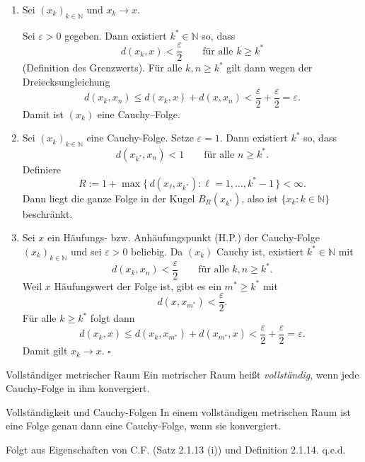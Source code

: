 \begin{beweisbox}
    \begin{enumerate}
    \item[(i)] Sei $(x_k)_{k\in\mathbb{N}}$ und $x_k\to x$.

    Sei $\varepsilon>0$ gegeben. Dann existiert $k^*\in\mathbb{N}$ so, dass
    $$
    d(x_k,x)<\frac{\varepsilon}{2}\qquad\text{für alle }k\ge k^*
    $$
    (Definition des Grenzwerts). Für alle $k,n\ge k^*$ gilt dann wegen der Dreiecksungleichung
    $$
    d(x_k,x_n)\le d(x_k,x)+d(x,x_n)<\frac{\varepsilon}{2}+\frac{\varepsilon}{2}=\varepsilon.
    $$
    Damit ist $(x_k)$ eine Cauchy--Folge.

    \item[(ii)] Sei $(x_k)_{k\in\mathbb{N}}$ eine Cauchy-Folge. Setze $\varepsilon=1$. Dann existiert $k^*$ so, dass
    $$
    d(x_{k^*},x_n)<1\qquad\text{für alle }n\ge k^*.
    $$
    Definiere
    $$
    R:=1+\max\{\,d(x_\ell,x_{k^*}):\ell=1,\dots,k^*-1\,\}<\infty.
    $$
    Dann liegt die ganze Folge in der Kugel $B_R(x_{k^*})$, also ist $\{x_k:k\in\mathbb{N}\}$ beschränkt.

    \item[(iii)] Sei $x$ ein Häufungs- bzw. Anhäufungspunkt (H.P.) der Cauchy-Folge $(x_k)_{k\in\mathbb{N}}$ und sei $\varepsilon>0$ beliebig. Da $(x_k)$ Cauchy ist, existiert $k^*\in\mathbb{N}$ mit
    $$
    d(x_k,x_n)<\frac{\varepsilon}{2}\qquad\text{für alle }k,n\ge k^*.
    $$
    Weil $x$ Häufungswert der Folge ist, gibt es ein $m^*\ge k^*$ mit
    $$
    d(x,x_{m^*})<\frac{\varepsilon}{2}.
    $$
    Für alle $k\ge k^*$ folgt dann
    $$
    d(x_k,x)\le d(x_k,x_{m^*})+d(x_{m^*},x)<\frac{\varepsilon}{2}+\frac{\varepsilon}{2}=\varepsilon.
    $$
    Damit gilt $x_k\to x$. $\square$
    \end{enumerate}
\end{beweisbox}

\begin{definition}{Vollständiger metrischer Raum}
    Ein metrischer Raum heißt \emph{vollständig}, wenn jede Cauchy-Folge in ihm konvergiert.
\end{definition}

\begin{korollar}{Vollständigkeit und Cauchy-Folgen}
    In einem vollständigen metrischen Raum ist eine Folge genau dann eine Cauchy-Folge, wenn sie konvergiert.
\end{korollar}

\begin{beweisbox}
    Folgt aus Eigenschaften von C.F. (Satz 2.1.13 (i)) und Definition 2.1.14. q.e.d.
\end{beweisbox}

